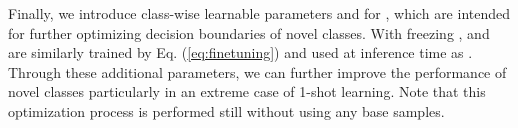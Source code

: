 Finally, we introduce class-wise learnable parameters  and  for , which are intended for further optimizing decision boundaries of novel classes. With freezing ,  and  are similarly trained by Eq. (\ref{eq:finetuning}) and used at inference time as . Through these additional parameters, we can further improve the performance of novel classes particularly in an extreme case of 1-shot learning. Note that this optimization process is performed still without using any base samples.































 
 
























 































%

